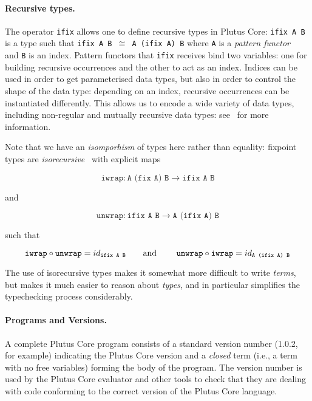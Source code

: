 \documentclass[a4paper]{article}
\begin{document}
\paragraph{Recursive types.}
\label{sec:ifix-note}
\noindent
The operator \texttt{ifix} allows one to define recursive types in
Plutus Core: \texttt{ifix A B} is a type such that \texttt{ifix A B
  $\cong$ A (ifix A) B} where \texttt{A} is a \textit{pattern
  functor}~\citep[2.4]{backhouseetal98} and \texttt{B} is an
index. Pattern functors that \texttt{ifix} receives bind two
variables: one for building recursive occurrences and the other to act
as an index. Indices can be used in order to get parameterised data
types, but also in order to control the shape of the data type:
depending on an index, recursive occurrences can be instantiated
differently.  This allows us to encode a wide variety of data types,
including non-regular and mutually recursive data types:
see~\citep[3.1]{unravelling-recursion} for more information.

Note that we have an \textit{isomporhism} of types here rather than
equality: fixpoint types are
\textit{isorecursive}~\citep[20.2]{Pierce:TAPL} with explicit maps

$$
\texttt{iwrap} : \texttt{A (fix A) B} \rightarrow \texttt{ifix A B}
$$

\noindent and

$$
\texttt{unwrap} : \texttt{ifix A B} \rightarrow  \texttt{A (ifix A) B}
$$

\noindent such that

$$
\texttt{iwrap} \circ \texttt{unwrap} = id_{ \texttt{ifix A B}}
\mbox{\qquad and \qquad}
\texttt{unwrap} \circ \texttt{iwrap} = id_{ \texttt{A (ifix A) B}}
$$

\noindent The use of isorecursive types makes it somewhat more difficult to
write \textit{terms}, but makes it much easier to reason about
\textit{types}, and in particular simplifies the typechecking process
considerably.

\paragraph{Programs and Versions.} A complete Plutus Core program
consists of a standard version number (1.0.2, for example) indicating
the Plutus Core version and a \textit{closed} term (i.e., a term with no
free variables) forming the body of the program.  The version number
is used by the Plutus Core evaluator and other tools to check that
they are dealing with code conforming to the correct version of the
Plutus Core language.
\end{document}
